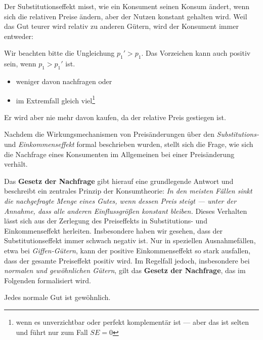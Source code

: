 Der Substitutionseffekt misst, wie ein Konsument seinen Konsum ändert, wenn sich die relativen Preise ändern, aber der Nutzen konstant gehalten wird.
Weil das Gut teurer wird relativ zu anderen Gütern, wird der Konsument immer entweder:
\begin{remark}
	Wir beachten bitte die Ungleichung $p_1' > p_1$. Das Vorzeichen kann auch positiv sein, wenn $p_1 > p_1'$ ist.
\end{remark}
\begin{itemize}
	\item weniger davon nachfragen oder
	\item im Extremfall gleich viel\footnote{wenn es unverzichtbar oder perfekt komplementär ist — aber das ist selten und führt nur zum Fall $SE=0$}
\end{itemize}
Er wird aber nie mehr davon kaufen, da der relative Preis gestiegen ist.

\noindent Nachdem die Wirkungsmechanismen von Preisänderungen über den \textit{Substitutions-} und \textit{Einkommenseffekt} formal beschrieben wurden, stellt sich die Frage, wie sich die Nachfrage eines Konsumenten im Allgemeinen bei einer Preisänderung verhält.

\noindent Das \textbf{Gesetz der Nachfrage} gibt hierauf eine grundlegende Antwort und beschreibt ein zentrales Prinzip der Konsumtheorie: \textit{In den meisten Fällen sinkt die nachgefragte Menge eines Gutes, wenn dessen Preis steigt — unter der Annahme, dass alle anderen Einflussgrößen konstant bleiben.}
Dieses Verhalten lässt sich aus der Zerlegung des Preiseffekts in Substitutions- und Einkommenseffekt herleiten. Insbesondere haben wir gesehen, dass der Substitutionseffekt immer schwach negativ ist. Nur in speziellen Ausnahmefällen, etwa bei \textit{Giffen-Gütern}, kann der positive Einkommenseffekt so stark ausfallen, dass der gesamte Preiseffekt positiv wird.
Im Regelfall jedoch, insbesondere bei \textit{normalen und gewöhnlichen Gütern}, gilt das \textbf{Gesetz der Nachfrage}, das im Folgenden formalisiert wird.
\begin{theorem} 
	Jedes normale Gut ist gewöhnlich.
\end{theorem}

